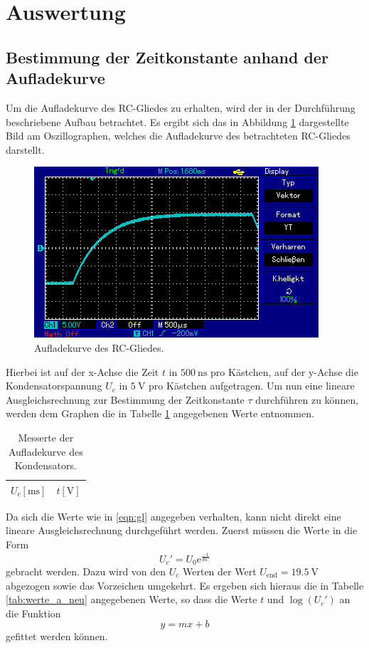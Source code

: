 \section{Auswertung}
\label{sec:Auswertung}
\subsection{Bestimmung der Zeitkonstante anhand der Aufladekurve}
Um die Aufladekurve des RC-Gliedes zu erhalten, wird der in der Durchführung beschriebene Aufbau betrachtet.
Es ergibt sich das in Abbildung \ref{fig:oz1} dargestellte Bild am Oszillographen, welches die Aufladekurve des betrachteten RC-Gliedes darstellt.

\begin{figure}[H]
  \centering
  \includegraphics{oz4.png}
  \caption{Aufladekurve des RC-Gliedes.}
  \label{fig:oz1}
\end{figure}

Hierbei ist auf der x-Achse die Zeit $t$ in $\SI{500}{\nano\second}$ pro Kästchen, auf der y-Achse die Kondensatorspannung $U_c$ in $\SI{5}{\volt}$ pro Kästchen aufgetragen.
Um nun eine lineare Ausgleichsrechnung zur Bestimmung der Zeitkonstante $\tau$ durchführen zu können, werden dem Graphen die in Tabelle \ref{tab:werte_a} angegebenen Werte entnommen.


\begin{table}[H]
  \centering
  \caption{Messerte der Aufladekurve des Kondensators.}
  \label{tab:werte_a}
  \begin{tabular}{c c}
    \toprule
    {$U_c [\si{\milli\second}]$} & {$t [\si{\volt}]$}\\
    \midrule
    
    \bottomrule
  \end{tabular}
\end{table}

Da sich die Werte wie in \eqref{eqn:gl} angegeben verhalten, kann nicht direkt eine lineare Ausgleichsrechnung durchgeführt werden.
Zuerst müssen die Werte in die Form
\begin{equation}
  U_c' = U_0 \mathrm{e}^{\frac{-t}{RC}}
\end{equation}
gebracht werden.
Dazu wird von den $U_c$ Werten der Wert $U_{\text{end}} = \SI{19.5}{\volt}$ abgezogen sowie das Vorzeichen umgekehrt.
Es ergeben sich hieraus die in Tabelle \ref{tab:werte_a_neu} angegebenen Werte, so dass die Werte $t$ und $\log(U_c')$ an die Funktion
\begin{equation}
  y = m x +b
\end{equation}
gefittet werden können.

